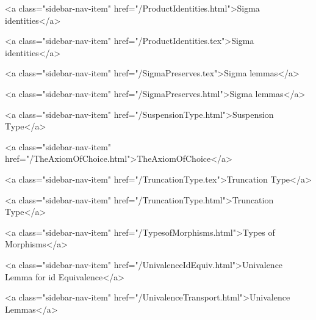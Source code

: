       
    
      
        
          <a class="sidebar-nav-item" href="/ProductIdentities.html">Sigma identities</a>
        
      
    
      
        
          <a class="sidebar-nav-item" href="/ProductIdentities.tex">Sigma identities</a>
        
      
    
      
        
          <a class="sidebar-nav-item" href="/SigmaPreserves.tex">Sigma lemmas</a>
        
      
    
      
        
          <a class="sidebar-nav-item" href="/SigmaPreserves.html">Sigma lemmas</a>
        
      
    
      
        
          <a class="sidebar-nav-item" href="/SuspensionType.html">Suspension Type</a>
        
      
    
      
        
          <a class="sidebar-nav-item" href="/TheAxiomOfChoice.html">TheAxiomOfChoice</a>
        
      
    
      
        
          <a class="sidebar-nav-item" href="/TruncationType.tex">Truncation Type</a>
        
      
    
      
        
          <a class="sidebar-nav-item" href="/TruncationType.html">Truncation Type</a>
        
      
    
      
        
          <a class="sidebar-nav-item" href="/TypesofMorphisms.html">Types of Morphisms</a>
        
      
    
      
        
          <a class="sidebar-nav-item" href="/UnivalenceIdEquiv.html">Univalence Lemma for id Equivalence</a>
        
      
    
      
        
          <a class="sidebar-nav-item" href="/UnivalenceTransport.html">Univalence Lemmas</a>
        
